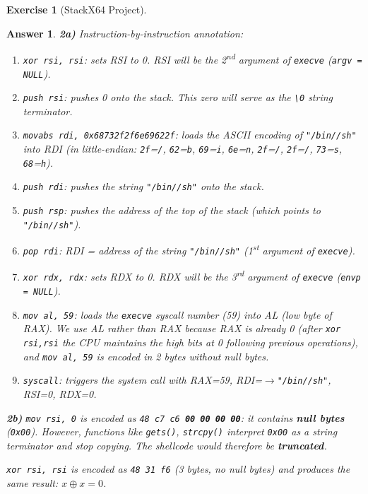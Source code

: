 \documentclass[a4paper,11pt]{article}
\theoremstyle{plain}
\newtheorem{correction}{Answer}
\theoremstyle{definition}
\newtheorem{exercice}{Exercise}
\begin{document}
\begin{exercice}[StackX64 Project]
\begin{correction}

\textbf{2a)} Instruction-by-instruction annotation:
\begin{enumerate}
    \item \texttt{xor rsi, rsi}: sets RSI to 0. RSI will be the 2\textsuperscript{nd} argument of \texttt{execve} (\texttt{argv = NULL}).
    \item \texttt{push rsi}: pushes 0 onto the stack. This zero will serve as the \texttt{\textbackslash 0} string terminator.
    \item \texttt{movabs rdi, 0x68732f2f6e69622f}: loads the ASCII encoding of \texttt{"/bin//sh"} into RDI (in little-endian: \texttt{2f}=\texttt{/}, \texttt{62}=\texttt{b}, \texttt{69}=\texttt{i}, \texttt{6e}=\texttt{n}, \texttt{2f}=\texttt{/}, \texttt{2f}=\texttt{/}, \texttt{73}=\texttt{s}, \texttt{68}=\texttt{h}).
    \item \texttt{push rdi}: pushes the string \texttt{"/bin//sh"} onto the stack.
    \item \texttt{push rsp}: pushes the address of the top of the stack (which points to \texttt{"/bin//sh"}).
    \item \texttt{pop rdi}: RDI = address of the string \texttt{"/bin//sh"} (1\textsuperscript{st} argument of \texttt{execve}).
    \item \texttt{xor rdx, rdx}: sets RDX to 0. RDX will be the 3\textsuperscript{rd} argument of \texttt{execve} (\texttt{envp = NULL}).
    \item \texttt{mov al, 59}: loads the \texttt{execve} syscall number (59) into AL (low byte of RAX). We use AL rather than RAX because RAX is already 0 (after \texttt{xor rsi,rsi} the CPU maintains the high bits at 0 following previous operations), and \texttt{mov al, 59} is encoded in 2 bytes without null bytes.
    \item \texttt{syscall}: triggers the system call with RAX=59, RDI=$\to$\texttt{"/bin//sh"}, RSI=0, RDX=0.
\end{enumerate}

\textbf{2b)} \texttt{mov rsi, 0} is encoded as \texttt{48 c7 c6 \textbf{00 00 00 00}}: it contains \textbf{null bytes} (\texttt{0x00}). However, functions like \texttt{gets()}, \texttt{strcpy()} interpret \texttt{0x00} as a string terminator and stop copying. The shellcode would therefore be \textbf{truncated}.

\texttt{xor rsi, rsi} is encoded as \texttt{48 31 f6} (3 bytes, no null bytes) and produces the same result: $x \oplus x = 0$.


\end{correction}
\end{exercice}
\end{document}
